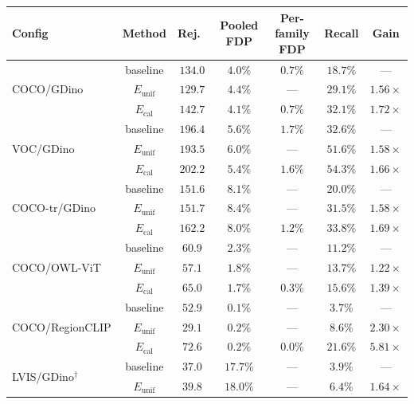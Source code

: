 \documentclass{article}
\theoremstyle{remark}
\newcommand{\1}{\mathbf{1}}
\begin{document}
\begin{table}[h]
\centering
\small
\begin{tabular*}{\linewidth}{@{\extracolsep{\fill}}lcccccc@{}}
\toprule
Config & Method & Rej.\ & Pooled FDP & Per-family FDP & Recall & Gain \\
\midrule
\multirow{3}{*}{COCO/GDino}
& baseline            & $134.0$ & $4.0\%$  & $0.7\%$ & $18.7\%$ & --- \\
& $E_{\mathrm{unif}}$  & $129.7$ & $4.4\%$  & ---     & $29.1\%$ & $1.56\times$ \\
& $E_{\mathrm{cal}}$   & $142.7$ & $4.1\%$  & $0.7\%$ & $\mathbf{32.1\%}$ & $\mathbf{1.72\times}$ \\
\midrule
\multirow{3}{*}{VOC/GDino}
& baseline            & $196.4$ & $5.6\%$  & $1.7\%$ & $32.6\%$ & --- \\
& $E_{\mathrm{unif}}$  & $193.5$ & $6.0\%$  & ---     & $51.6\%$ & $1.58\times$ \\
& $E_{\mathrm{cal}}$   & $202.2$ & $5.4\%$  & $1.6\%$ & $\mathbf{54.3\%}$ & $\mathbf{1.66\times}$ \\
\midrule
\multirow{3}{*}{COCO-tr/GDino}
& baseline            & $151.6$ & $8.1\%$  & ---     & $20.0\%$ & --- \\
& $E_{\mathrm{unif}}$  & $151.7$ & $8.4\%$  & ---     & $31.5\%$ & $1.58\times$ \\
& $E_{\mathrm{cal}}$   & $162.2$ & $8.0\%$  & $1.2\%$ & $\mathbf{33.8\%}$ & $\mathbf{1.69\times}$ \\
\midrule
\multirow{3}{*}{COCO/OWL-ViT}
& baseline            & $60.9$  & $2.3\%$  & ---     & $11.2\%$ & --- \\
& $E_{\mathrm{unif}}$  & $57.1$  & $1.8\%$  & ---     & $13.7\%$ & $1.22\times$ \\
& $E_{\mathrm{cal}}$   & $65.0$  & $1.7\%$  & $0.3\%$ & $\mathbf{15.6\%}$ & $\mathbf{1.39\times}$ \\
\midrule
\multirow{3}{*}{COCO/RegionCLIP}
& baseline            & $52.9$  & $0.1\%$  & ---     & $3.7\%$  & --- \\
& $E_{\mathrm{unif}}$  & $29.1$  & $0.2\%$  & ---     & $8.6\%$  & $2.30\times$ \\
& $E_{\mathrm{cal}}$   & $72.6$  & $0.2\%$  & $0.0\%$ & $\mathbf{21.6\%}$ & $\mathbf{5.81\times}$ \\
\midrule
\multirow{3}{*}{LVIS/GDino$^{\dagger}$}
& baseline            & $37.0$  & $17.7\%$ & ---     & $3.9\%$  & --- \\
& $E_{\mathrm{unif}}$  & $39.8$  & $18.0\%$ & ---     & $6.4\%$  & $1.64\times$ \\

\end{tabular*}
\end{table}
\end{document}
